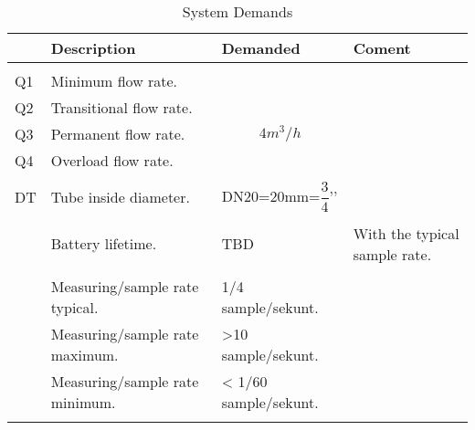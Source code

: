 \begin{table}[H]
        \centering
        \begin{tabularx}{\linewidth}{|p{20pt}|X|X |X|}
                      \hline
                      
   &\textbf{Description} &\textbf{Demanded} &\textbf{Coment} 
        \\\hline
        
        &	&  &	  \\ 
  Q1  &	Minimum flow rate.&	&	   
        
		\\\hline

            
  Q2  &	Transitional flow rate.&	&	   
        
		\\\hline
		        
   Q3 &Permanent flow rate.	&	$$ 4 m^{3}/h$$&	   
        
		\\\hline
		        
  Q4  &Overload flow rate.	&	&	   
        
		\\\hline
		        
 	  	 &	&  &	  \\ 
   DT &Tube inside diameter.  	& DN20=20mm=$\dfrac{3}{4}$’’&	   
        
		\\\hline
		 &	&  &	  \\ 
    &	Battery lifetime. &TBD	& With the typical sample rate. 	   
        
		\\\hline
		 &	&  &	  \\   
    &Measuring/sample rate typical. 	&1/4 sample/sekunt.	&	   
        
		\\\hline    
      
        
    &Measuring/sample rate maximum. 	&	>10 sample/sekunt.&	   
        
		\\\hline    
      
                      
    &	Measuring/sample rate minimum.&< 1/60 sample/sekunt.	&	   
        
		\\\hline    
      
                
    &	&	&	   
        
		\\\hline    
      

\end{tabularx}
\caption{System Demands }
\label{tab:System_Demands }
\end{table}

















